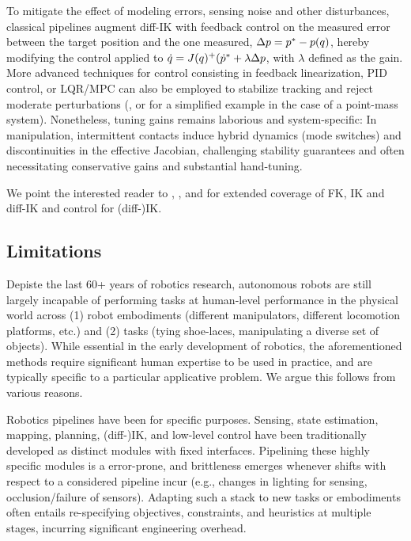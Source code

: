 To mitigate the effect of modeling errors, sensing noise and other disturbances, classical pipelines augment diff-IK with feedback control on the measured error between the target position and the one measured, \( \Delta p = p^* - p(q) \), hereby modifying the control applied to \( \dot q = J(q)^+ (\dot {p}^* + \lambda \Delta p \), with \( \lambda \) defined as the gain.
More advanced techniques for control consisting in feedback linearization, PID control, or LQR/MPC can also be employed to stabilize tracking and reject moderate perturbations (\cite[Chapter~8]{sicilianoSpringerHandbookRobotics2016}, or \cite[Chapter~8]{tedrakeRoboticManipulationPerception} for a simplified example in the case of a point-mass system).
Nonetheless, tuning gains remains laborious and system-specific: In manipulation, intermittent contacts induce hybrid dynamics (mode switches) and discontinuities in the effective Jacobian, challenging stability guarantees and often necessitating conservative gains and substantial hand-tuning.

We point the interested reader to \cite[Chapter~2,7,8]{sicilianoSpringerHandbookRobotics2016}, \cite[Chapter~6,11]{lynchModernRoboticsMechanics2017}, and \cite[Chapter~3,8]{tedrakeRoboticManipulationPerception} for extended coverage of FK, IK and diff-IK and control for (diff-)IK.

\subsection{Limitations}
Depiste the last 60+ years of robotics research, autonomous robots are still largely incapable of performing tasks at human-level performance in the physical world across (1) robot embodiments (different manipulators, different locomotion platforms, etc.) and (2) tasks (tying shoe-laces, manipulating a diverse set of objects).
While essential in the early development of robotics, the aforementioned methods require significant human expertise to be used in practice, and are typically specific to a particular applicative problem. We argue this follows from various reasons.

Robotics pipelines have been  for specific purposes. 
Sensing, state estimation, mapping, planning, (diff-)IK, and low-level control have been traditionally developed as distinct modules with fixed interfaces.
Pipelining these highly specific modules is a error-prone, and brittleness emerges whenever shifts with respect to a considered pipeline incur (e.g., changes in lighting for sensing, occlusion/failure of sensors).
Adapting such a stack to new tasks or embodiments often entails re-specifying objectives, constraints, and heuristics at multiple stages, incurring significant engineering overhead.

